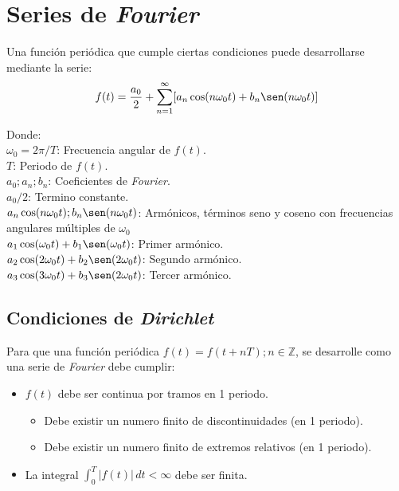 \section{Series de \emph{Fourier}}
Una función periódica  que cumple ciertas condiciones puede desarrollarse
mediante la serie:
\begin{equation}
    f(t)=\frac{a_0}{2}+
    \sum_{n=1}^{\infty}[a_n\cos(n\omega_0 t)+b_n\sen(n\omega_0 t)]
\end{equation}

Donde:\\
\indent\indent$\omega_0=2\pi/T$: Frecuencia angular de $f(t)$.\\
\indent\indent$T$: Periodo de $f(t)$.\\
\indent\indent$a_0; a_n; b_n$: Coeficientes de \emph{Fourier}.\\
\indent\indent$a_0/2$: Termino constante.\\
\indent\indent$a_n\cos(n\omega_0 t);b_n\sen(n\omega_0 t)$: Armónicos, términos
seno y coseno con frecuencias angulares múltiples de $\omega_0$\\

\indent\indent$a_1\cos( \omega_0 t)+b_1\sen( \omega_0 t)$: Primer armónico.\\
\indent\indent$a_2\cos(2\omega_0 t)+b_2\sen(2\omega_0 t)$: Segundo armónico.\\
\indent\indent$a_3\cos(3\omega_0 t)+b_3\sen(2\omega_0 t)$: Tercer armónico.\\

\subsection{Condiciones de \emph{Dirichlet}}
Para que una función periódica $f(t)=f(t+nT); n\in\mathbb{Z}$, se desarrolle
como una serie de \emph{Fourier} debe cumplir:

\begin{itemize}
\item $f(t)$ debe ser continua por tramos en 1 periodo.
    \begin{figure}[H]
        \centering
        
    \end{figure}
    \begin{itemize}
    \item Debe existir un numero finito de discontinuidades (en 1 periodo).
    \item Debe existir un numero finito de extremos relativos (en 1 periodo).
    \end{itemize}
\item La integral $\int_0^T |f(t)|\,dt<\infty$ debe ser finita.
\end{itemize}

